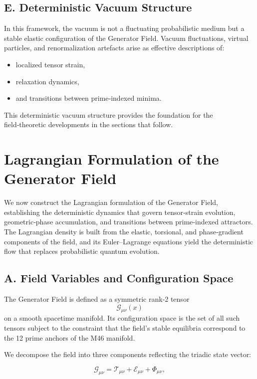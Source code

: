 \documentclass[reprint,amsmath,amssymb,aps,prl,floatfix]{revtex4-2}
\begin{document}
\subsection{E. Deterministic Vacuum Structure}

In this framework, the vacuum is not a fluctuating probabilistic medium but a stable elastic configuration of the Generator Field. Vacuum fluctuations, virtual particles, and renormalization artefacts arise as effective descriptions of:
\begin{itemize}
\item localized tensor strain,
\item relaxation dynamics,
\item and transitions between prime‑indexed minima.
\end{itemize}

This deterministic vacuum structure provides the foundation for the field‑theoretic developments in the sections that follow.

\section{Lagrangian Formulation of the Generator Field}

We now construct the Lagrangian formulation of the Generator Field, establishing the deterministic dynamics that govern tensor‑strain evolution, geometric‑phase accumulation, and transitions between prime‑indexed attractors. The Lagrangian density is built from the elastic, torsional, and phase‑gradient components of the field, and its Euler–Lagrange equations yield the deterministic flow that replaces probabilistic quantum evolution.

\subsection{A. Field Variables and Configuration Space}

The Generator Field is defined as a symmetric rank‑2 tensor  
\[
\mathcal{G}_{\mu\nu}(x)
\]  
on a smooth spacetime manifold. Its configuration space is the set of all such tensors subject to the constraint that the field’s stable equilibria correspond to the 12 prime anchors of the M46 manifold.
\medskip

We decompose the field into three components reflecting the triadic state vector:

\[
\mathcal{G}_{\mu\nu}
=
\mathcal{T}_{\mu\nu}
+
\mathcal{E}_{\mu\nu}
+
\Phi_{\mu\nu},
\]
\end{document}
